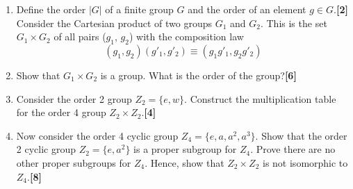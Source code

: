 \documentclass[a4paper]{article}
\begin{document}
\newpage
\begin{qns}\leavevmode
\begin{enumerate}[label=(\roman*)]
\item Define the order $|G|$ of a finite group $G$ and the order of an element $g\in G$.\hfill\textbf{[2]}\\[5pt]
Consider the Cartesian product of two groups $G_1$ and $G_2$. This is the set $G_1\times G_2$ of all pairs ($g_1$, $g_2$) with the composition law
$$(g_1, g_2)(g'_1 , g′_2) ≡ (g_1g′_1, g_2g′_2 )$$
\item Show that $G_1\times G_2$ is a group. What is the order of the group?\hfill\textbf{[6]}
\item Consider the order 2 group $Z_2=\{e,w\}$.  Construct the multiplication table for the order 4 group $Z_2\times Z_2$.\hfill\textbf{[4]}
\item Now consider the order 4 cyclic group $Z_4 =\{e, a, a^2, a^3\}$. Show that the order 2 cyclic group $Z_2=\{e,a^2\}$ is a proper subgroup for $Z_4$. Prove there are no other proper subgroups for $Z_4$. Hence, show that $Z_2\times Z_2$ is not isomorphic to $Z_4$.\hfill\textbf{[8]}
\end{enumerate}
\end{qns}
\end{document}
